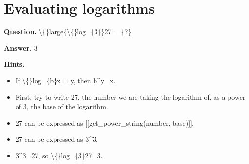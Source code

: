 \documentclass{article}
\begin{document}
\section*{Evaluating logarithms}
\textbf{Question.} \textbackslash\{\}large\{\textbackslash\{\}log\_\{3\}\}27 = \{?\}

\textbf{Answer.} 3

\textbf{Hints.}
\begin{itemize}
  \item If \textbackslash\{\}log\_\{b\}x = y, then b\textasciicircum{}y=x.
  \item First, try to write 27, the number we are taking the logarithm of, as a power of 3, the base of the logarithm.
  \item 27 can be expressed as [[get\_power\_string(number, base)]].
  \item 27 can be expressed as 3\textasciicircum{}3.
  \item 3\textasciicircum{}3=27, so \textbackslash\{\}log\_\{3\}27=3.
\end{itemize}
\end{document}
